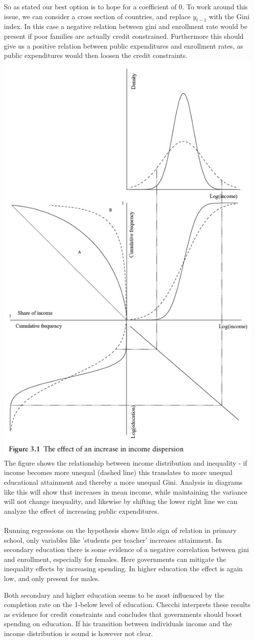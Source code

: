 \documentclass[12pt, a4paper]{article}
\begin{document}
\begin{multicols}{2}
\begin{itemize}
\end{itemize}
So as stated our best option is to hope for a coefficient of 0. To work around this issue, we can consider a cross section of countries, and replace $y_{t-1}$ with the Gini index. In this case a negative relation between gini and enrollment rate would be present if poor families are actually credit constrained. Furthermore this should give us a positive relation between public expenditures and enrollment rates, as public expenditures would then loosen the credit constraints.
\includegraphics[width = 0.45 \textwidth]{dist.jpg}
The figure shows the relationship between income distribution and inequality - if income becomes more unequal (dashed line) this translates to more unequal educational attainment and thereby a more unequal Gini. Analysis in diagrams like this will show that increases in mean income, while maintaining the variance will not change inequality, and likewise by shifting the lower right line we can analyze the effect of increasing public expenditures.
\\ \\
Running regressions on the hypothesis shows little sign of relation in primary school, only variables like 'students per teacher' increases attainment. In secondary education there is some evidence of a negative correlation between gini and enrollment, especially for females. Here governments can mitigate the inequality effects by increasing spending. In higher education the effect is again low, and only present for males.

Both secondary and higher education seems to be most influenced by the completion rate on the 1-below level of education. Checchi interprets these results as evidence for credit constraints and concludes that governments should boost spending on education. If his transition between individuals income and the income distribution is sound is however not clear.


\end{multicols}
\end{document}
